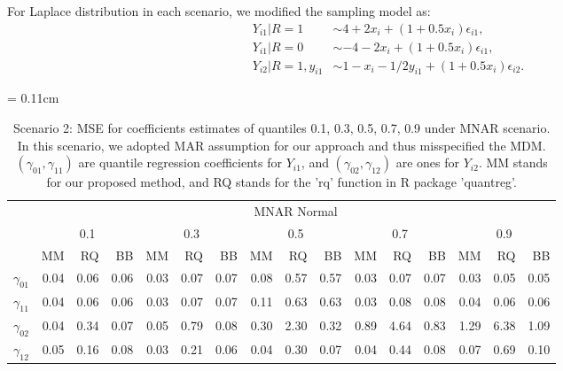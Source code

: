 \documentclass[12pt]{article}
\begin{document}
For Laplace distribution in each scenario, we modified the sampling
model as:
\begin{align*}
  Y_{i1} | R = 1 & \sim 4 + 2x_i + (1 + 0.5x_i) \epsilon_{i1} , \\
  Y_{i1}| R = 0 & \sim  -4 - 2x_i + (1 + 0.5x_i) \epsilon_{i1} , \\
  Y_{i2}| R = 1, y_{i1}&\sim 1 - x_i - 1/2y_{i1} + (1 + 0.5x_i)
  \epsilon_{i2}.
\end{align*}

\begin{table}[h]
  \renewcommand{\arraystretch}{1.3}
  \centering
  \caption{Scenario 2: MSE for coefficients estimates of quantiles
    0.1, 0.3, 0.5, 0.7, 0.9 under MNAR scenario. In this scenario, we adopted MAR assumption
    for our approach and thus misspecified the MDM. $(\gamma_{01}, \gamma_{11})$
    are quantile regression coefficients for $Y_{i1}$, and $(\gamma_{02}, \gamma_{12})$
    are ones for $Y_{i2}$. MM stands for our proposed method, and RQ stands for the 'rq'
    function in R package 'quantreg'.} \label{tab:sim2}
  \vspace{10pt}
  \tabcolsep = 0.11cm
  \begin{tabular}{rrrrrrrrrrrrrrrr}
    \toprule
    & \multicolumn{15}{c}{MNAR Normal} \\
    \cline{2-16}
    &  \multicolumn{3}{c}{0.1} &  \multicolumn{3}{c}{0.3} &  \multicolumn{3}{c}{0.5} &
    \multicolumn{3}{c}{0.7} &  \multicolumn{3}{c}{0.9} \\
    \cline{2-16}
    & MM   & RQ   & BB   & MM   & RQ   & BB   & MM   & RQ   & BB   & MM   & RQ   & BB   & MM   & RQ   & BB   \\
    \hline
    $\gamma_{01}$ & 0.04 & 0.06 & 0.06 & 0.03 & 0.07 & 0.07 & 0.08 & 0.57 & 0.57 & 0.03 & 0.07 & 0.07 & 0.03 & 0.05 & 0.05 \\
    $\gamma_{11}$ & 0.04 & 0.06 & 0.06 & 0.03 & 0.07 & 0.07 & 0.11 & 0.63 & 0.63 & 0.03 & 0.08 & 0.08 & 0.04 & 0.06 & 0.06 \\
    $\gamma_{02}$ & 0.04 & 0.34 & 0.07 & 0.05 & 0.79 & 0.08 & 0.30 & 2.30 & 0.32 & 0.89 & 4.64 & 0.83 & 1.29 & 6.38 & 1.09 \\
    $\gamma_{12}$ & 0.05 & 0.16 & 0.08 & 0.03 & 0.21 & 0.06 & 0.04 & 0.30 & 0.07 & 0.04 & 0.44 & 0.08 & 0.07 & 0.69 & 0.10 \\
    \bottomrule
  \end{tabular}


\end{table}
\end{document}

